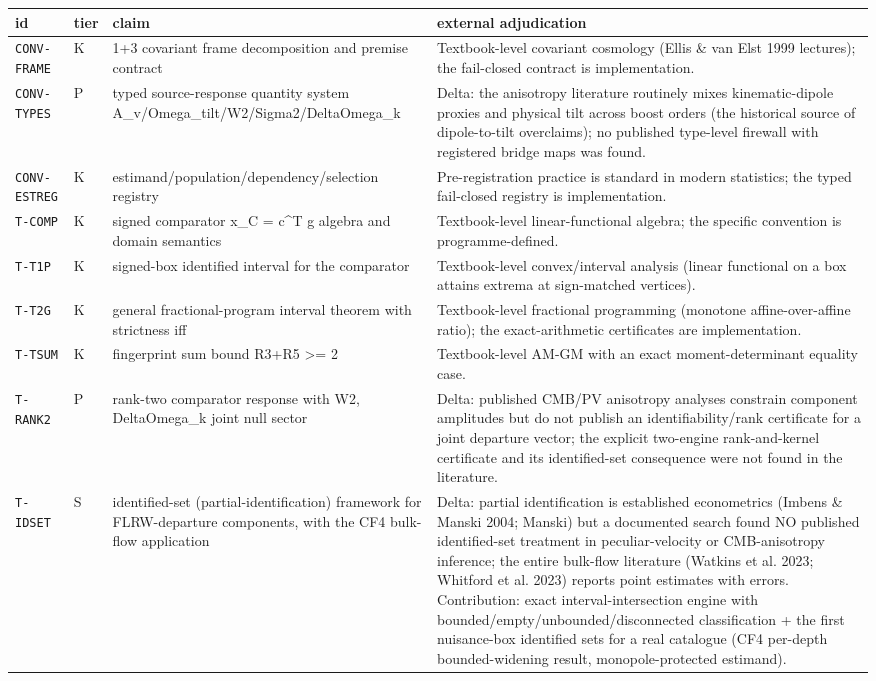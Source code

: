 \documentclass[10pt]{article}
\theoremstyle{definition}
\newcommand{\code}[1]{\texttt{\small #1}}
\begin{document}
\begin{center}\scriptsize
\begin{longtable}{p{2.0cm} p{0.7cm} p{5.4cm} p{6.5cm}}
\toprule id & tier & claim & external adjudication \\ \midrule
\code{CONV-FRAME} & K & 1+3 covariant frame decomposition and premise contract & Textbook-level covariant cosmology (Ellis \& van Elst 1999 lectures); the fail-closed contract is implementation. \\[2pt]
\code{CONV-TYPES} & P & typed source-response quantity system A\_v/Omega\_tilt/W2/Sigma2/DeltaOmega\_k & Delta: the anisotropy literature routinely mixes kinematic-dipole proxies and physical tilt across boost orders (the historical source of dipole-to-tilt overclaims); no published type-level firewall with registered bridge maps was found. \\[2pt]
\code{CONV-ESTREG} & K & estimand/population/dependency/selection registry & Pre-registration practice is standard in modern statistics; the typed fail-closed registry is implementation. \\[2pt]
\code{T-COMP} & K & signed comparator x\_C = c\^{}T g algebra and domain semantics & Textbook-level linear-functional algebra; the specific convention is programme-defined. \\[2pt]
\code{T-T1P} & K & signed-box identified interval for the comparator & Textbook-level convex/interval analysis (linear functional on a box attains extrema at sign-matched vertices). \\[2pt]
\code{T-T2G} & K & general fractional-program interval theorem with strictness iff & Textbook-level fractional programming (monotone affine-over-affine ratio); the exact-arithmetic certificates are implementation. \\[2pt]
\code{T-TSUM} & K & fingerprint sum bound R3+R5 >= 2 & Textbook-level AM-GM with an exact moment-determinant equality case. \\[2pt]
\code{T-RANK2} & P & rank-two comparator response with {W2, DeltaOmega\_k} joint null sector & Delta: published CMB/PV anisotropy analyses constrain component amplitudes but do not publish an identifiability/rank certificate for a joint departure vector; the explicit two-engine rank-and-kernel certificate and its identified-set consequence were not found in the literature. \\[2pt]
\code{T-IDSET} & S & identified-set (partial-identification) framework for FLRW-departure components, with the CF4 bulk-flow application & Delta: partial identification is established econometrics (Imbens \& Manski 2004; Manski) but a documented search found NO published identified-set treatment in peculiar-velocity or CMB-anisotropy inference; the entire bulk-flow literature (Watkins et al. 2023; Whitford et al. 2023) reports point estimates with errors. Contribution: exact interval-intersection engine with bounded/empty/unbounded/disconnected classification + the first nuisance-box identified sets for a real catalogue (CF4 per-depth bounded-widening result, monopole-protected estimand). \\[2pt]

\end{longtable}
\end{center}
\end{document}
